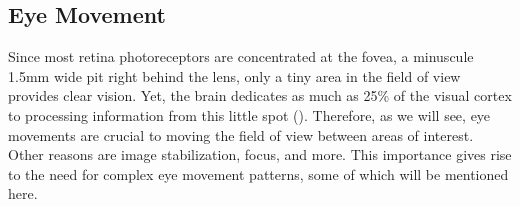 



\subsection{Eye Movement}
Since most retina photoreceptors are concentrated at the fovea, a minuscule 1.5mm wide pit right behind the lens, only a tiny area in the field of view provides clear vision. Yet, the brain dedicates as much as 25\% of the visual cortex to processing information from this little spot (\cite{hubel1974}). Therefore, as we will see, eye movements are crucial to moving the field of view between areas of interest. Other reasons are image stabilization, focus, and more. This importance gives rise to the need for complex eye movement patterns, some of which will be mentioned here.

